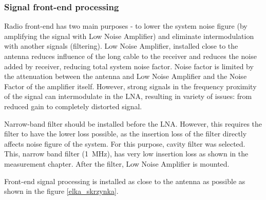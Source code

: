 \subsubsection{Signal front-end processing}
Radio front-end has two main purposes - to lower the system noise figure (by amplifying the signal with Low Noise Amplifier) and eliminate intermodulation with another signals (filtering). Low Noise Amplifier, installed close to the antenna reduces influence of the long cable to the receiver and reduces the noise added by receiver, reducing total system noise factor. Noise factor is limited by the attenuation between the antenna and Low Noise Amplifier and the Noise Factor of the amplifier itself. However, strong signals in the frequency proximity of the signal can intermodulate in the LNA, resulting in variety of issues: from reduced gain to completely distorted signal.

Narrow-band filter should be installed before the LNA. However, this requires the filter to have the lower loss possible, as the insertion loss of the filter directly affects noise figure of the system. For this purpose, cavity filter was selected. This, narrow band filter (\SI{1}{\MHz}), has very low insertion loss as shown in the measurement chapter. After the filter, Low Noise Amplifier is mounted.

Front-end signal processing is installed as close to the antenna as possible as shown in the figure \ref{elka_skrzynka}.

